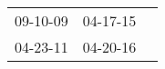 \begin{supertabular}{lll}
 09-10-09\textsuperscript{} &  04-17-15\textsuperscript{} \\
 04-23-11\textsuperscript{} &  04-20-16\textsuperscript{} \\
\end{supertabular}
